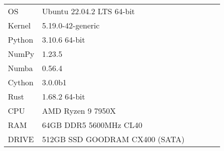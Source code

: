 \begin{tabular}{llllll}
    \midrule\midrule
    OS              & Ubuntu 22.04.2 LTS 64-bit         \\
    Kernel          & 5.19.0-42-generic                 \\
    Python          & 3.10.6 64-bit                     \\
    NumPy           & 1.23.5                            \\
    Numba           & 0.56.4                            \\
    Cython          & 3.0.0b1                           \\
    Rust            & 1.68.2 64-bit                     \\\midrule
    CPU             & AMD Ryzen 9 7950X                 \\
    RAM             & 64GB DDR5 5600MHz CL40            \\
    DRIVE           & 512GB SSD GOODRAM CX400 (SATA)    \\\midrule
  \end{tabular}